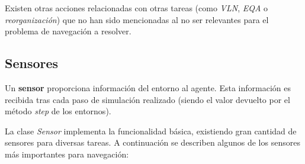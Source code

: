 Existen otras acciones relacionadas con otras tareas (como \textit{VLN}, \textit{EQA} o \textit{reorganización}) que no han sido mencionadas al no ser relevantes para el problema de navegación a resolver.

\subsection{Sensores}

Un \textbf{sensor} proporciona información del entorno al agente. Esta información es recibida tras cada paso de simulación realizado (siendo el valor devuelto por el método \textit{step} de los entornos).

La clase \textit{Sensor} implementa la funcionalidad básica, existiendo gran cantidad de sensores para diversas tareas. A continuación se describen algunos de los sensores más importantes para navegación:

